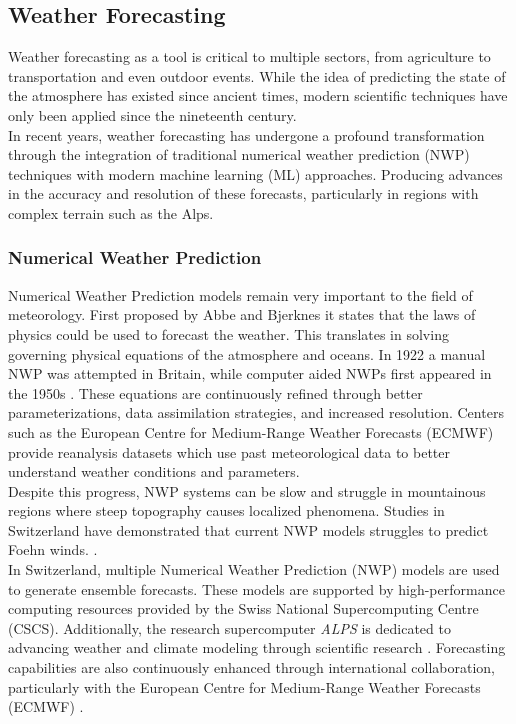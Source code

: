 \subsection{Weather Forecasting}

Weather forecasting as a tool is critical to multiple sectors, from agriculture to transportation and even outdoor events. While the idea of predicting the state of the atmosphere has existed since ancient times, modern scientific techniques have only been applied since the nineteenth century.\cite{Sen2017WeatherAW}
\\
In recent years, weather forecasting has undergone a profound transformation through the integration of traditional numerical weather prediction (NWP) techniques with modern machine learning (ML) approaches. Producing advances in the accuracy and resolution of these forecasts, particularly in regions with complex terrain such as the Alps.
\\
\subsubsection{Numerical Weather Prediction}

Numerical Weather Prediction models remain very important to the field of meteorology.
First proposed by Abbe and Bjerknes it states that the laws of physics could be used to forecast the weather. \cite{bauer2015quiet} This translates in
solving governing physical equations of the atmosphere and oceans.
In 1922 a manual NWP was attempted in Britain, while computer aided NWPs first appeared in the 1950s \cite{schultz2021can}.
These equations are continuously refined through better parameterizations, data assimilation strategies, and increased resolution. 
Centers such as the European Centre for Medium-Range Weather Forecasts (ECMWF) provide reanalysis datasets which use past meteorological data to better understand weather conditions and parameters\cite{hersbach2020era5,monteiro2022review}. 
\\
Despite this progress, NWP systems can be slow and struggle in mountainous regions where steep topography causes localized phenomena. Studies in Switzerland have demonstrated that current NWP models struggles to predict Foehn winds. \cite{price2025probabilistic, buzzi2008challenges, aichinger2022machine}.
\\
In Switzerland, multiple Numerical Weather Prediction (NWP) models are used to generate ensemble forecasts. These models are supported by high-performance computing resources provided by the Swiss National Supercomputing Centre (CSCS). Additionally, the research supercomputer \textit{ALPS} is dedicated to advancing weather and climate modeling through scientific research \cite{abdulah2024boosting}. Forecasting capabilities are also continuously enhanced through international collaboration, particularly with the European Centre for Medium-Range Weather Forecasts (ECMWF) \cite{meteoswiss_icon}.

